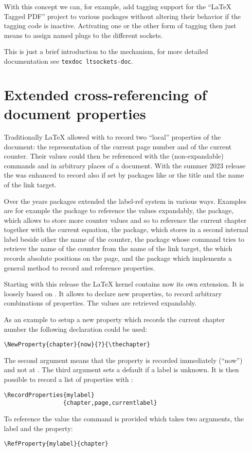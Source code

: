 \documentclass{ltnews}
\begin{document}
With this concept we can, for example, add tagging support for the
\enquote{\LaTeX{} Tagged PDF} project to various packages without
altering their behavior if the tagging code is inactive. Activating
one or the other form of tagging then just means to assign named plugs
to the different sockets.

This is just a brief introduction to the mechanism, for more detailed
documentation see \texttt{texdoc ltsockets-doc}.



\section{Extended cross-referencing of document properties}

Traditionally \LaTeX{} allowed with  to record two \enquote{local} 
properties of the document: the representation of the current page number and 
of the current counter. Their values could then be referenced with the 
(non-expandable)  commands  and  in arbitrary places of a 
document.  With the summer 2023 release the  was enhanced to record 
also if set by packages like  or  the title and 
the name of the link target. 

Over the years packages extended the label-ref system in various ways. 
Examples are for example the  package to reference the values 
expandably, the  package, which allows to store more counter 
values and so to reference the current chapter together with the current 
equation, the  package, which stores in a second internal label 
beside other the name of the counter,  the  package whose 
 command tries to retrieve the name of the counter from the name 
of the link target, the  which records absolute positions on 
the page, and the  package which implements a general method to 
record and reference properties. 

Starting with this release the \LaTeX{} kernel contains now its own 
extension. It is loosely based on . It allows to declare new 
properties, to record arbitrary combinations of properties. The values are 
retrieved expandably. 

As an example to setup a new property which records the current chapter 
number the following declaration could be used: 
\begin{verbatim}
\NewProperty{chapter}{now}{?}{\thechapter}
\end{verbatim}
The second argument means that the property is recorded immediately 
(\enquote{now}) and not at . The third argument sets a default if a 
label is unknown. It is then possible to record a list of properties with 
: 
\begin{verbatim}
\RecordProperties{mylabel}
                 {chapter,page,currentlabel}
\end{verbatim}
To reference the value the  command is provided which takes 
two arguments, the label and the property: 
\begin{verbatim}
\RefProperty{mylabel}{chapter}
\end{verbatim}
 
\end{document}
